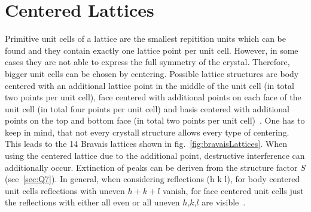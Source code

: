  
\section{Centered Lattices}\label{sec:Q6}
Primitive unit cells of a lattice are the smallest repitition units which can be found and they contain exactly one lattice point per unit cell. However, in some cases they are not able to express the full symmetry of the crystal. Therefore, bigger unit cells can be chosen by centering. Possible lattice structures are body centered with an additional lattice point in the middle of the unit cell (in total two points per unit cell), face centered with additional points on each face of the unit cell (in total four points per unit cell) and basis centered with additional points on the top and bottom face (in total two points per unit cell)~\cite{Schwarzenbach.2001}. One has to keep in mind, that not every crystall structure allows every type of centering. This leads to the 14 Bravais lattices shown in fig.~\ref{fig:bravaisLattices}. When using the centered lattice due to the additional point, destructive interference can additionally occur. Extinction of peaks can be deriven from the structure factor $S$ (see~\ref{sec:Q7}). In general, when considering reflections (h k l), for body centered unit cells reflections with uneven $h+k+l$ vanish, for face centered unit cells just the reflections with either all even or all uneven $h$,$k$,$l$ are visible~\cite{Demtroeder.2016}.

